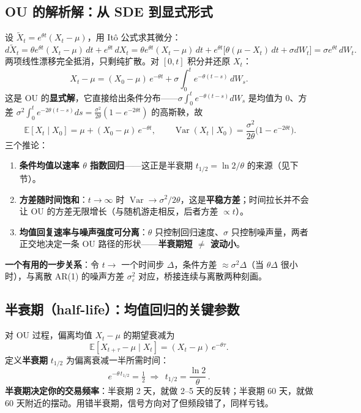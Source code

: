 \documentclass[UTF8,11pt]{ctexart}
\begin{document}
\subsection{OU 的解析解：从 SDE 到显式形式}
设 $\tilde X_t = e^{\theta t}(X_t-\mu)$，用 It\^o 公式求其微分：
\begin{equation}
d\tilde X_t = \theta e^{\theta t}(X_t-\mu)\,dt + e^{\theta t}\,dX_t
= \theta e^{\theta t}(X_t-\mu)\,dt + e^{\theta t}\big[\theta(\mu-X_t)\,dt + \sigma dW_t\big]
= \sigma e^{\theta t}\,dW_t.
\end{equation}
两项线性漂移完全抵消，只剩纯扩散。对 $[0,t]$ 积分并还原 $X_t$：
\begin{equation}
X_t - \mu = (X_0-\mu)\,e^{-\theta t} + \sigma\int_0^t e^{-\theta(t-s)}\,dW_s.
\end{equation}
这是 OU 的\textbf{显式解}，它直接给出条件分布——$\sigma\int_0^t e^{-\theta(t-s)}dW_s$ 是均值为 0、方差
$\sigma^2\int_0^t e^{-2\theta(t-s)}ds = \frac{\sigma^2}{2\theta}(1-e^{-2\theta t})$ 的高斯鞅，故
\begin{equation}
\boxed{\;\mathbb{E}[X_t\mid X_0] = \mu + (X_0-\mu)\,e^{-\theta t},\qquad
\operatorname{Var}(X_t\mid X_0) = \frac{\sigma^2}{2\theta}\big(1-e^{-2\theta t}\big).}
\end{equation}
三个推论：
\begin{enumerate}[itemsep=2pt]
\item \textbf{条件均值以速率 $\theta$ 指数回归}——这正是半衰期 $t_{1/2}=\ln2/\theta$ 的来源（见下节）。
\item \textbf{方差随时间饱和}：$t\to\infty$ 时 $\operatorname{Var}\to\sigma^2/2\theta$，这是\textbf{平稳方差}；时间拉长并不会让 OU 的方差无限增长（与随机游走相反，后者方差 $\propto t$）。
\item \textbf{均值回复速率与噪声强度可分离}：$\theta$ 只控制回归速度、$\sigma$ 只控制噪声量，两者正交地决定一条 OU 路径的形状——\textbf{半衰期短 $\neq$ 波动小}。
\end{enumerate}
\textbf{一个有用的一步关系}：令 $t\to$ 一个时间步 $\Delta$，条件方差 $\approx \sigma^2\Delta$（当 $\theta\Delta$ 很小时），与离散 AR(1) 的噪声方差 $\sigma_\varepsilon^2$ 对应，桥接连续与离散两种刻画。

\subsection{半衰期（half-life）：均值回归的关键参数}
对 OU 过程，偏离均值 $X_t-\mu$ 的期望衰减为
\begin{equation}
\mathbb{E}[X_{t+\tau}-\mu \mid X_t] = (X_t-\mu)\,e^{-\theta \tau}.
\end{equation}
定义\textbf{半衰期} $t_{1/2}$ 为偏离衰减一半所需时间：
\begin{equation}
e^{-\theta\,t_{1/2}} = \tfrac12 \;\Longrightarrow\; \boxed{\,t_{1/2} = \frac{\ln 2}{\theta}\,}.
\end{equation}
\textbf{半衰期决定你的交易频率}：半衰期 2 天，就做 2--5 天的反转；半衰期 60 天，就做 60 天附近的摆动。用错半衰期，信号方向对了但频段错了，同样亏钱。
\end{document}
